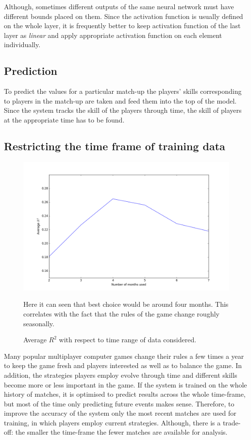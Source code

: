 \documentclass[12pt,a4paper]{book}
\newcommand\note[1]{\vspace*{-0.5\baselineskip}\caption*{#1}}
\begin{document}
Although, sometimes different outputs of the same neural network must have different bounds placed on them.
Since the activation function is usually defined on the whole layer, it is frequently better to keep activation function of the last layer as \emph{linear} and apply appropriate activation function on each element individually.

\subsection{Prediction}
To predict the values for a particular match-up the players' skills corresponding to players in the match-up are taken and feed them into the top of the model.
Since the system tracks the skill of the players through time, the skill of players at the appropriate time has to be found.

\subsection{Restricting the time frame of training data}
\begin{figure}[ht]
\centering
\includegraphics[scale=0.5]{time-variance}
\caption{Average $R^2$ with respect to time range of data considered.}
\note{Here it can seen that best choice would be around four months.
This correlates with the fact that the rules of the game change roughly seasonally.}
\label{fig:time-variance}
\end{figure}
Many popular multiplayer computer games change their rules a few times a year to keep the game fresh and players interested as well as to balance the game.
In addition, the strategies players employ evolve through time and different skills become more or less important in the game.
If the system is trained on the whole history of matches, it is optimised to predict results across the whole time-frame, but most of the time only predicting future events makes sense.
Therefore, to improve the accuracy of the system only the most recent matches are used for training, in which players employ current strategies.
Although, there is a trade-off: the smaller the time-frame the fewer matches are available for analysis.
\end{document}
